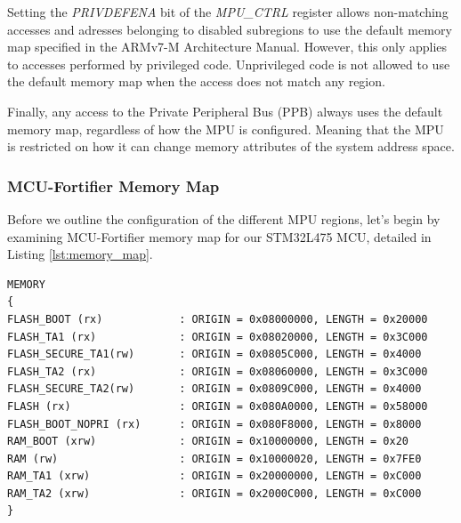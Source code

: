 \documentclass{article}
\begin{document}
Setting the \textit{PRIVDEFENA} bit of the \textit{MPU\_CTRL} register allows non-matching accesses and adresses belonging to disabled subregions to use the default memory map specified in the ARMv7-M Architecture Manual\cite{armv7m}. However, this only applies to accesses performed by privileged code. Unprivileged code is not allowed to use the default memory map when the access does not match any region.

Finally, any access to the Private Peripheral Bus (PPB) always uses the default memory map, regardless of how the MPU is configured. Meaning that the MPU is restricted on how it can change memory attributes of the system address space.

\subsubsection{MCU-Fortifier Memory Map}
\label{subsubsec:memory_map}
Before we outline the configuration of the different MPU regions, let's begin by examining MCU-Fortifier memory map for our STM32L475 MCU, detailed in Listing \ref{lst:memory_map}.

\begin{lstlisting}[caption={MCU-Fortifier memory map linker script (memory\_map.ld)},captionpos=b,label=lst:memory_map]
MEMORY
{
FLASH_BOOT (rx)        	   : ORIGIN = 0x08000000, LENGTH = 0x20000  
FLASH_TA1 (rx)             : ORIGIN = 0x08020000, LENGTH = 0x3C000  
FLASH_SECURE_TA1(rw)       : ORIGIN = 0x0805C000, LENGTH = 0x4000  
FLASH_TA2 (rx)             : ORIGIN = 0x08060000, LENGTH = 0x3C000  
FLASH_SECURE_TA2(rw)       : ORIGIN = 0x0809C000, LENGTH = 0x4000    
FLASH (rx)                 : ORIGIN = 0x080A0000, LENGTH = 0x58000   
FLASH_BOOT_NOPRI (rx)      : ORIGIN = 0x080F8000, LENGTH = 0x8000   
RAM_BOOT (xrw)             : ORIGIN = 0x10000000, LENGTH = 0x20 	
RAM (rw)             	   : ORIGIN = 0x10000020, LENGTH = 0x7FE0   
RAM_TA1 (xrw)       	   : ORIGIN = 0x20000000, LENGTH = 0xC000   
RAM_TA2 (xrw)              : ORIGIN = 0x2000C000, LENGTH = 0xC000    
}
\end{lstlisting}
\end{document}
